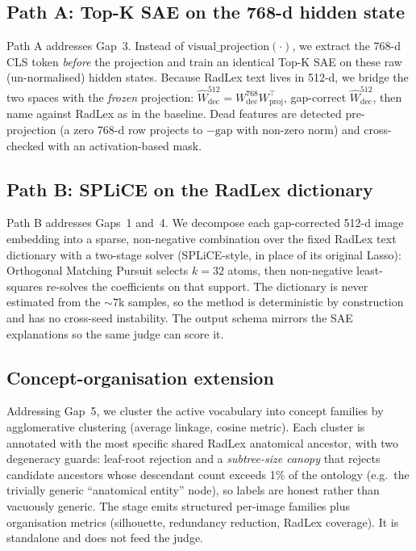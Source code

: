 \documentclass[sigconf, nonacm]{acmart}
\begin{document}
\subsection{Path A: Top-K SAE on the 768-d hidden state}
Path A addresses Gap~3. Instead of $\mathrm{visual\_projection}(\cdot)$, we extract the 768-d CLS token \emph{before} the projection and train an identical Top-K SAE on these raw (un-normalised) hidden states. Because RadLex text lives in 512-d, we bridge the two spaces with the \emph{frozen} projection: $\hat W_{\mathrm{dec}}^{512}=W_{\mathrm{dec}}^{768}W_{\mathrm{proj}}^{\top}$, gap-correct $\hat W_{\mathrm{dec}}^{512}$, then name against RadLex as in the baseline. Dead features are detected pre-projection (a zero 768-d row projects to $-\mathrm{gap}$ with non-zero norm) and cross-checked with an activation-based mask.

\subsection{Path B: SPLiCE on the RadLex dictionary}
Path B addresses Gaps~1 and~4. We decompose each gap-corrected 512-d image embedding into a sparse, non-negative combination over the fixed RadLex text dictionary with a two-stage solver (SPLiCE-style, in place of its original Lasso): Orthogonal Matching Pursuit selects $k{=}32$ atoms, then non-negative least-squares re-solves the coefficients on that support. The dictionary is never estimated from the ${\sim}7$k samples, so the method is deterministic by construction and has no cross-seed instability. The output schema mirrors the SAE explanations so the same judge can score it.

\subsection{Concept-organisation extension}
Addressing Gap~5, we cluster the active vocabulary into concept families by agglomerative clustering (average linkage, cosine metric). Each cluster is annotated with the most specific shared RadLex anatomical ancestor, with two degeneracy guards: leaf-root rejection and a \emph{subtree-size canopy} that rejects candidate ancestors whose descendant count exceeds 1\% of the ontology (e.g.\ the trivially generic ``anatomical entity'' node), so labels are honest rather than vacuously generic. The stage emits structured per-image families plus organisation metrics (silhouette, redundancy reduction, RadLex coverage). It is standalone and does not feed the judge.
\end{document}
